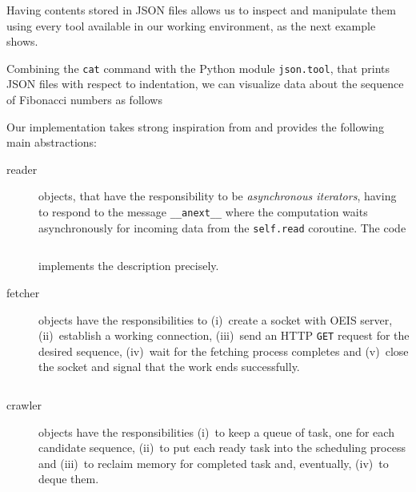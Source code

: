 Having contents stored in JSON files allows us to inspect and manipulate them
using every tool available in our working environment, as the next example
shows.

\begin{example}
Combining the \verb|cat| command with the Python module \verb|json.tool|, that prints JSON files
with respect to indentation, we can visualize data about the sequence of Fibonacci
numbers as follows
\end{example}


Our implementation takes strong inspiration from
\citep{VANROSSUM:DAVIS:async:await} and provides the following main abstractions:

\begin{description}
\item[reader] objects, that have the responsibility to be \textit{asynchronous
iterators}, having to respond to the message \verb|__anext__| where the
computation waits asynchronously for incoming data from the \verb|self.read|
coroutine. The code
\inputminted[fontsize=\small,stripnl=false,firstline=28,lastline=39]
{python}{../src/crawling.py} implements the description precisely.

\item[fetcher] objects have the responsibilities to (i)~create a socket with
OEIS server, (ii)~establish a working connection, (iii)~send an HTTP \verb|GET|
request for the desired sequence, (iv)~wait for the fetching process completes
and (v)~close the socket and signal that the work ends successfully.
\inputminted[fontsize=\small,stripnl=false,firstline=41,lastline=86]
    {python}{../src/crawling.py}

\item[crawler] objects have the responsibilities (i)~to keep a queue of task,
one for each candidate sequence, (ii)~to put each ready task into the
scheduling process and (iii)~to reclaim memory for completed task and,
eventually, (iv)~to deque them.
\inputminted[fontsize=\small,stripnl=false,firstline=89,lastline=117]
    {python}{../src/crawling.py}

\end{description}

